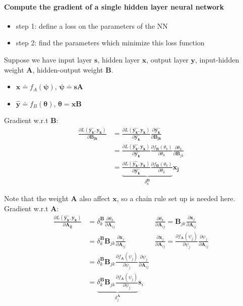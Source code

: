 \documentclass[sutton_barto_notes.tex]{subfiles}
\begin{document}
\paragraph{Compute the gradient of a single hidden layer neural network }

\begin{itemize}
\item step 1: define a loss on the parameters of the NN
\item step 2: find the parameters which minimize this loss function
\end{itemize}

Suppose we have input layer $\bm{s}$, hidden layer $\bm{x}$, output layer $\bm{y}$, input-hidden weight $\bm{A}$, hidden-output weight $\bm{B}$.

\begin{itemize}
\item $\bm{x} \doteq f_A(\bm{\psi})$, $\bm{\psi} \doteq \bm{s}\bm{A}$
\item $\bm{\hat{y}} \doteq f_B(\bm{\theta})$, $\bm{\theta} = \bm{x}\bm{B}$
\end{itemize}

Gradient w.r.t $\bm{B}$:
\begin{align*}
\frac{\partial L(\hat{\bm{y_k}}, \bm{y_k})}{\partial \bm{B_{jk}}} &= \frac{\partial L(\hat{\bm{y_k}}, \bm{y_k})}{\partial \hat{\bm{y_k}}}\frac{\partial \hat{\bm{y_k}}}{\partial \bm{B_{jk}}} \\
&= \frac{\partial L(\hat{\bm{y_k}}, \bm{y_k})}{\partial \hat{\bm{y_k}}}\frac{\partial f_{\bm{B}}(\theta_k)}{\partial\theta_k}\frac{\partial\theta_k}{\partial\bm{B}_{jk}} \\
&= \underbrace{\frac{\partial L(\hat{\bm{y_k}}, \bm{y_k})}{\partial \hat{\bm{y_k}}}\frac{\partial f_{\bm{B}}(\theta_k)}{\partial\theta_k}}_{\delta_k^{\bm{B}}} \bm{x_j}
\end{align*}

Note that the weight $\bm{A}$ also affect $\bm{x}$, so a chain rule set up is needed here. Gradient w.r.t $\bm{A}$:
\begin{align*}
\frac{\partial L(\hat{\bm{y_k}}, \bm{y_k})}{\partial \bm{A_{ij}}} &= \delta_k^{\bm{B}} \frac{\partial\theta_k}{\partial\bm{A}_{ij}} & \frac{\partial\theta_k}{\partial\bm{A}_{ij}} = \bm{B}_{jk}\frac{\partial \bm{x}_j}{\partial \bm{A}_{ij}} \\
&= \delta_k^{\bm{B}} \bm{B}_{jk}\frac{\partial \bm{x}_j}{\partial \bm{A}_{ij}} & \frac{\partial \bm{x}_j}{\partial \bm{A}_{ij}} = \frac{\partial f_{\bm{A}}(\psi_j) }{\partial \psi_j} \frac{\partial \psi_j}{\partial \bm{A}_{ij}} \\
&= \delta_k^{\bm{B}} \bm{B}_{jk} \frac{\partial f_{\bm{A}}(\psi_j) }{\partial \psi_j} \frac{\partial \psi_j}{\partial \bm{A}_{ij}} \\
&= \underbrace{\delta_k^{\bm{B}}\bm{B}_{jk} \frac{\partial f_{\bm{A}}(\psi_j) }{\partial \psi_j}}_{\delta_j^{\bm{A}}} \bm{s}_i
\end{align*}
\end{document}

